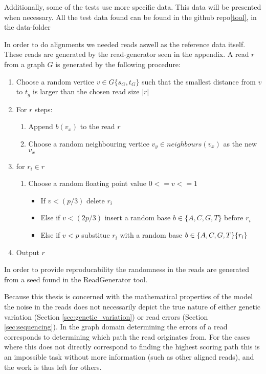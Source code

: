 \documentclass[thesis.tex]{subfiles}
\begin{document}
Additionally, some of the tests use more specific data. This data will be presented when necessary. All the test data found can be found in the github repo\ref{tool}, in the data-folder\\
\par\noindent
In order to do alignments we needed reads aswell as the reference data itself. These reads are generated by the read-generator seen in the appendix. A read $r$ from a graph $G$ is generated by the following procedure:
\begin{enumerate}
  \item Choose a random vertice $v \in G\{s_G, t_G\}$ such that the smallest distance from $v$ to $t_g$ is larger than the chosen read size $|r|$
  \item For $r$ steps:
  \begin{enumerate}
    \item Append $b(v_x)$ to the read $r$
    \item Choose a random neighbouring vertice $v_y \in neighbours(v_x)$ as the new $v_x$
  \end{enumerate}
  \item for $r_i \in r$
  \begin{enumerate}
    \item Choose a random floating point value $0<=v<=1$
    \begin{itemize}
      \item If $v<(p/3)$ delete $r_i$
      \item Else if $v<(2p/3)$ insert a random base $b \in \{A, C, G, T\}$ before $r_i$
      \item Else if $v<p$ substitue $r_i$ with a random base $b \in \{A, C, G, T\} \\ \{r_i\}$
    \end{itemize}
  \end{enumerate}
  \item Output $r$
\end{enumerate}
In order to provide reproducability the randomness in the reads are generated from a seed found in the ReadGenerator tool.\\
\par\noindent
Because this thesis is concerned with the mathematical properties of the model the noise in the reads does not necessarily depict the true nature of either genetic variation (Section \ref{sec:genetic_variation}) or read errors (Section \ref{sec:sequencing}). In the graph domain determining the errors of a read corresponds to determining which path the read originates from. For the cases where this does not directly correspond to finding the highest scoring path this is an impossible task without more information (such as other aligned reads), and the work is thus left for others. 
\end{document}
